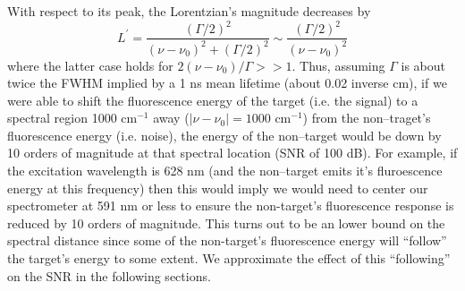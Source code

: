 With respect to its peak, the Lorentzian's magnitude decreases by
\begin{equation}
L^{\prime}
=
\frac
{(\Gamma/2)^2}
{(\nu - \nu_{0})^2 + (\Gamma/2)^2}
\sim
\frac{(\Gamma/2)^2}{(\nu - \nu_{0})^2}
\label{norm lorentzian}
\end{equation}
where the latter case holds for $2(\nu - \nu_{0})/\Gamma>>1$. Thus, assuming $\Gamma$ is about twice the FWHM implied by a 1 ns mean lifetime (about 0.02 inverse cm), if we were able to shift the fluorescence energy of the target (i.e. the signal) to a spectral region 1000 cm$^{-1}$ away ($|\nu - \nu_{0}|=1000$ cm$^{-1}$) from the non--traget's fluorescence energy (i.e. noise), the energy of the non--target would be down by 10 orders of magnitude at that spectral location (SNR of 100 dB). For example, if the excitation wavelength is 628 nm (and the non--target emits it's fluroescence energy at this frequency) then this would imply we would need to center our spectrometer at 591 nm or less to ensure the non-target's fluorescence response is reduced by 10 orders of magnitude. This turns out to be an lower bound on the spectral distance since some of the non-target's fluorescence energy will ``follow'' the target's energy to some extent. We approximate the effect of this ``following'' on the SNR in the following sections.
 